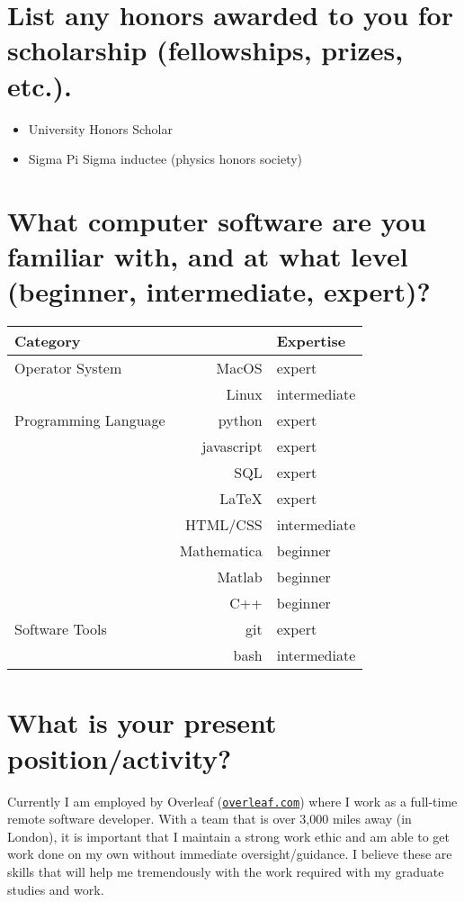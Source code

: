 \documentclass[11pt]{article}
\begin{document}
\section*{List any honors awarded to you for scholarship (fellowships, prizes, etc.).}

\begin{itemize}
    \item University Honors Scholar
    \item Sigma Pi Sigma inductee (physics honors society)
\end{itemize}

\section*{What computer software are you familiar with, and at what level (beginner, intermediate, expert)?}

\begin{tabular}{lrl}
    Category &  & Expertise \\ \toprule
    Operator System & MacOS & expert \\
     & Linux & intermediate \\
    Programming Language & python & expert \\
     & javascript & expert \\
     & SQL & expert \\
     & \LaTeX{} & expert \\
     & HTML/CSS & intermediate \\
     & Mathematica & beginner \\
     & Matlab & beginner \\
     & C++ & beginner \\
    Software Tools & git & expert \\
     & bash & intermediate
\end{tabular}

\section*{What is your present position/activity?}

Currently I am employed by Overleaf (\href{https:www.overleaf.com}{\texttt{overleaf.com}}) where I work as a full-time remote software developer. With a team that is over 3,000 miles away (in London), it is important that I maintain a strong work ethic and am able to get work done on my own without immediate oversight/guidance. I believe these are skills that will help me tremendously with the work required with my graduate studies and work.
\end{document}
